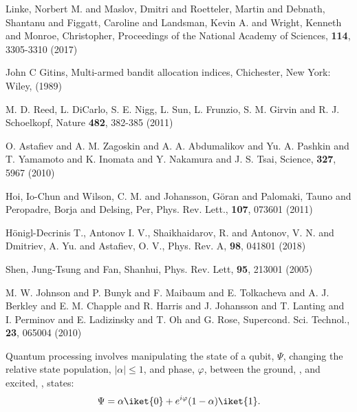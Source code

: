 
\begin{thebibliography}{99}

 Linke,  Norbert M. and  Maslov, Dmitri and  Roetteler, Martin
  and Debnath, Shantanu and Figgatt, Caroline and Landsman, Kevin A.  and Wright,
  Kenneth  and  Monroe,  Christopher,  Proceedings of  the  National  Academy  of
  Sciences, \textbf{114}, 3305-3310 (2017)

  John  C  Gitins, Multi-armed  bandit  allocation  indices,
  Chichester, New York: Wiley, (1989)
        
 {M.  D. Reed,  L. DiCarlo,  S. E. Nigg,  L. Sun,  L.  Frunzio,
    S. M. Girvin and R. J. Schoelkopf}, Nature \textbf{482}, 382-385 (2011)

 O. Astafiev  and A. M. Zagoskin and A.  A. Abdumalikov and
  Yu. A. Pashkin and T. Yamamoto and K.  Inomata and Y. Nakamura and J. S.  Tsai,
  Science, \textbf{327}, 5967 (2010)

  Hoi, Io-Chun  and Wilson,  C.  M.  and Johansson,  G\"oran and
  Palomaki,  Tauno and  Peropadre,  Borja  and Delsing,  Per,  Phys. Rev.  Lett.,
  \textbf{107}, 073601 (2011)

 H\"onigl-Decrinis  T., Antonov I. V.,  Shaikhaidarov, R. and
  Antonov,  V. N.  and  Dmitriev, A.  Yu.  and  Astafiev, O.  V.,  Phys. Rev.  A,
  \textbf{98}, 041801 (2018)

  Shen,   Jung-Tsung  and  Fan,  Shanhui,   Phys.   Rev.  Lett,
  \textbf{95}, 213001 (2005)

  {M.  W.   Johnson  and  P.   Bunyk  and  F.   Maibaum  and
    E. Tolkacheva  and A.  J.  Berkley and  E.  M. Chapple  and R. Harris  and J.
    Johansson and T. Lanting  and I.  Perminov and E.  Ladizinsky  and T.  Oh and
    G.  Rose}, {Supercond. Sci.  Technol.}, \textbf{23}, {065004} (2010)

 Quantum processing involves manipulating the state of a qubit,
  $\Psi$, changing the relative state population, $\ensuremath{|\alpha|} \le 1$, and phase,
  $\varphi$, between the ground, , and excited, , states:
  \begin{equation}
    \label{eq:4}
    \Psi = \alpha\iket{0} + e^{i\varphi}(1-\alpha)\iket{1}.
  \end{equation}


\end{thebibliography}
